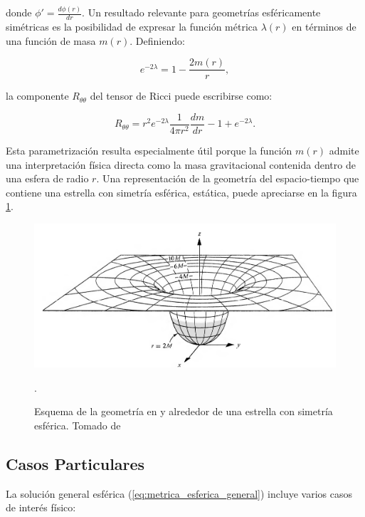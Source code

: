 donde $\phi' = \frac{d\phi(r)}{dr}$. Un resultado relevante para geometrías esféricamente simétricas es la posibilidad de expresar la función métrica $\lambda(r)$ en términos de una función de masa $m(r)$. Definiendo:

\begin{equation}
	e^{-2\lambda} = 1 - \frac{2m(r)}{r},
	\label{eq:definicion_masa}
\end{equation}

la componente $R_{\theta\theta}$ del tensor de Ricci puede escribirse como:

\begin{equation}
	R_{\theta\theta} = r^2 e^{-2\lambda} \frac{1}{4\pi r^2}\frac{dm}{dr} - 1 + e^{-2\lambda}.
\end{equation}

Esta parametrización resulta especialmente útil porque la función $m(r)$ admite una interpretación física directa como la masa gravitacional contenida dentro de una esfera de radio $r$. Una representación de la geometría del espacio-tiempo que contiene una estrella con simetría esférica, estática, puede apreciarse en la figura \ref{fig:geometry-misner}.

\begin{figure}[h]
	\centering
	\includegraphics[width=0.7\linewidth]{Figuras/geometry-misner}
	\caption{Esquema de la geometría en y alrededor de una estrella con simetría esférica. Tomado de \cite{misnerGravitation2017}}.
	\label{fig:geometry-misner}
\end{figure}


\subsection{Casos Particulares}

La solución general esférica (\ref{eq:metrica_esferica_general}) incluye varios casos de interés físico:

